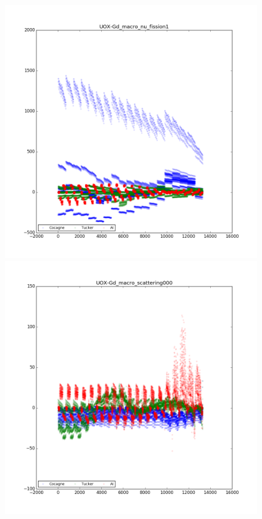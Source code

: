 \begin{center}
\begin{figure}[h]
\begin{minipage}[b]{0.5\linewidth}
   \end{minipage}
   \begin{minipage}[b]{0.5\linewidth}
      \centering \includegraphics[scale=0.3]{images/UOX-Gd/UOX-Gd_macro_nu_fission1.png}
   \end{minipage}
	 \begin{minipage}[b]{0.5\linewidth}
      \centering \includegraphics[scale=0.3]{images/UOX-Gd/UOX-Gd_macro_scattering000.png}

\end{minipage}
\end{figure}
\end{center}
